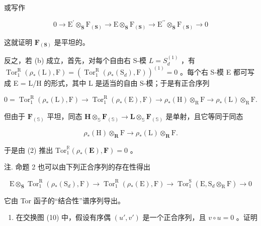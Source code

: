 或写作

\[
0 \rightarrow \mathrm{E} ^ {\prime} \otimes_ {\mathbf {S}} \mathrm{F} _ {(\mathbf {S})} \rightarrow \mathrm{E} \otimes_ {\mathbf {S}} \mathrm{F} _ {(\mathbf {S})} \rightarrow \mathrm{E} ^ {\prime \prime} \otimes_ {\mathbf {S}} \mathrm{F} _ {(\mathbf {S})} \rightarrow 0
\]

这就证明 \(\mathbf{F}_{(\mathbf{S})}\) 是平坦的。

反之，若 (b) 成立，首先，对每个自由右 S-模 \(L = S_{d}^{(1)}\) ，有 \(\operatorname{Tor}_{1}^{\mathrm{R}}(\rho_{*}(\mathrm{L}), \mathrm{F}) = (\operatorname{Tor}_{1}^{\mathrm{R}}(\rho_{*}(\mathrm{S}_{d}), \mathrm{F}))^{(1)} = 0\) 。每个右 S-模 E 都可写成 E = L/H 的形式，其中 L 是适当的自由 S-模；于是有正合序列

\[
0 = \operatorname{Tor} _ {1} ^ {\mathrm{R}} (\rho_ {*} (\mathrm{L}), \mathrm{F}) \rightarrow \operatorname{Tor} _ {1} ^ {\mathrm{R}} (\rho_ {*} (\mathrm{E}), \mathrm{F}) \rightarrow \rho_ {*} (\mathrm{H}) \otimes_ {\mathrm{R}} \mathrm{F} \rightarrow \rho_ {*} (\mathrm{L}) \otimes_ {\mathrm{R}} \mathrm{F}. \tag {2}
\]

但由于 \(\mathbf{F}_{(\mathbb{S})}\) 平坦，同态 \(\mathbf{H} \otimes_{\mathbb{S}} \mathbf{F}_{(\mathbb{S})} \to \mathbf{L} \otimes_{\mathbb{S}} \mathbf{F}_{(\mathbb{S})}\) 是单射，且它等同于同态

\[
\rho_ {*} (\mathrm{H}) \otimes_ {\mathbf {R}} \mathrm{F} \rightarrow \rho_ {*} (\mathrm{L}) \otimes_ {\mathbf {R}} \mathrm{F}.
\]

于是由 (2) 推出 \(\mathrm{Tor}_1^{\mathbb{R}}(\rho_*(\mathbf{E}),\mathbf{F}) = 0\) 。

注. 命题 2 也可以由下列正合序列的存在性得出

\[
\mathrm{E} \otimes_ {\mathbf {S}} \operatorname{Tor} _ {1} ^ {\mathrm{R}} (\rho_ {*} (\mathrm{S} _ {d}), \mathrm{F}) \rightarrow \operatorname{Tor} _ {1} ^ {\mathrm{R}} (\rho_ {*} (\mathrm{E}), \mathrm{F}) \rightarrow \operatorname{Tor} _ {1} ^ {\mathrm{S}} (\mathrm{E}, \mathrm{S} _ {d} \otimes_ {\mathrm{R}} \mathrm{F}) \rightarrow 0
\]

它由 Tor 函子的``结合性''谱序列导出。



\begin{enumerate}
\def\labelenumi{\arabic{enumi}.}
\tightlist
\item
  在交换图 (10) 中，假设有序偶 \((u', v')\) 是一个正合序列，且 \(v \circ u = 0\) 。证明
\end{enumerate}

